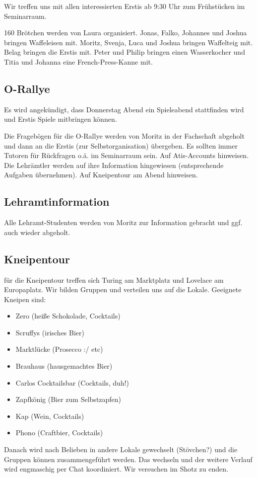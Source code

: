 \documentclass[10pt,twocolumn,ngerman]{scrartcl}
\begin{document}
Wir treffen uns mit allen interessierten Erstis ab 9:30 Uhr zum Frühstücken
im Seminarraum.

160 Brötchen werden von Laura organisiert. Jonas, Falko, Johannes
und Joshua bringen Waffeleisen mit. Moritz, Svenja, Luca und Joshua
bringen Waffelteig mit. Belag bringen die Erstis mit. Peter und Philip
bringen einen Wasserkocher und Titia und Johanna eine French-Press-Kanne
mit.

\subsection{O-Rallye}

Es wird angekündigt, dass Donnerstag Abend ein Spieleabend stattfinden
wird und Erstis Spiele mitbringen können.

Die Fragebögen für die O-Rallye werden von Moritz in der Fachschaft
abgeholt und dann an die Erstis (zur Selbstorganisation) übergeben.
Es sollten immer Tutoren für Rückfragen o.ä. im Seminarraum sein.
Auf Atis-Accounts hinweisen. Die Lehrämtler werden auf ihre Information
hingewiesen (entsprechende Aufgaben übernehmen). Auf Kneipentour am
Abend hinweisen.

\subsection{Lehramtinformation}

Alle Lehramt-Studenten werden von Moritz zur Information gebracht
und ggf. auch wieder abgeholt.

\subsection{Kneipentour}

für die Kneipentour treffen sich Turing am Marktplatz und Lovelace
am Europaplatz. Wir bilden Gruppen und verteilen uns auf die Lokale.
Geeignete Kneipen sind:
\begin{itemize}
\item Zero (heiße Schokolade, Cocktails)
\item Scruffys (irisches Bier)
\item Marktlücke (Prosecco :/ etc)
\item Brauhaus (hausgemachtes Bier)
\item Carlos Cocktailsbar (Cocktails, duh!)
\item Zapfkönig (Bier zum Selbstzapfen)
\item Kap (Wein, Cocktails)
\item Phono (Craftbier, Cocktails)
\end{itemize}
Danach wird nach Belieben in andere Lokale gewechselt (Stövchen?)
und die Gruppen können zusammengeführt werden. Das wechseln und der
weitere Verlauf wird engmaschig per Chat koordiniert. Wir versuchen
im Shotz zu enden. 
\end{document}
